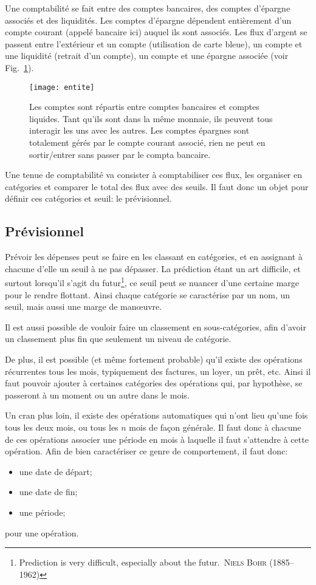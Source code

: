 Une comptabilité se fait entre des comptes bancaires, des comptes d'épargne
associés et des liquidités. Les comptes d'épargne dépendent entièrement d'un
compte courant (appelé bancaire ici) auquel ils sont associés. Les flux d'argent
se passent entre l'extérieur et un compte (utilisation de carte bleue), un compte
et une liquidité (retrait d'un compte), un compte et une épargne associée
(voir Fig.~\ref{compta:comptes}).
\begin{figure}
\centering
\texttt{[image: entite]}
\caption{\label{compta:comptes}Les comptes sont répartis entre comptes bancaires et
        comptes liquides. Tant qu'ils sont dans la même monnaie, ils peuvent tous
        interagir les uns avec les autres. Les comptes épargnes sont totalement gérés
        par le compte courant associé, rien ne peut en sortir/entrer sans passer
        par le compta bancaire.}
\end{figure}

Une tenue de comptabilité va consister à comptabiliser ces flux, les organiser
en catégories et comparer le total des flux avec des seuils. Il faut donc
un objet pour définir ces catégories et seuil: le prévisionnel.

\subsection{Prévisionnel}

Prévoir les dépenses peut se faire en les classant en catégories,
et en assignant à chacune d'elle un seuil à ne pas dépasser. 
La prédiction étant un art difficile,
et surtout lorsqu'il s'agit du futur\footnote{\og Prediction is very
difficult, especially about the futur.\fg\ \textsc{Niels Bohr}
(1885--1962)}, ce seuil peut se nuancer d'une certaine marge
pour le rendre flottant.
Ainsi chaque catégorie se caractérise par un nom, un seuil, mais
aussi une marge de man\oe uvre.

Il est aussi possible de vouloir faire un classement en 
sous-catégories, afin d'avoir un classement plus fin que
seulement un niveau de catégorie.

De plus, il est possible (et même fortement probable) qu'il existe des
opérations récurrentes tous les mois, typiquement des factures, 
un loyer, un prêt, etc. Ainsi il faut pouvoir ajouter
à certaines catégories des opérations qui, par hypothèse,
se passeront à un moment ou un autre dans le mois.

Un cran plus loin, il existe des opérations automatiques qui n'ont lieu qu'une
fois tous les deux mois, ou tous les $n$ mois de façon générale.
Il faut donc à chacune de ces opérations associer une période en
mois à laquelle il faut s'attendre à cette opération. Afin de bien
caractériser ce genre de comportement, il faut donc:
\begin{itemize}
\item une date de départ;
\item une date de fin;
\item une période;
\end{itemize}
pour une opération.

